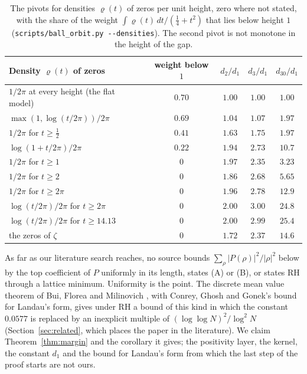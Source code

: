 \documentclass[11pt]{article}
\theoremstyle{definition}
\begin{document}
\begin{table}[ht]
\centering
\small
\begin{tabular}{@{}lcccc@{}}
\toprule
Density $\varrho(t)$ of zeros & weight below $1$ & $d_2/d_1$ & $d_3/d_1$ & $d_{30}/d_1$ \\
\midrule
$1/2\pi$ at every height (the flat model) & $0.70$ & $1.00$ & $1.00$ & $1.00$ \\
$\max(1, \log(t/2\pi))/2\pi$ & $0.69$ & $1.04$ & $1.07$ & $1.97$ \\
$1/2\pi$ for $t \ge \frac12$ & $0.41$ & $1.63$ & $1.75$ & $1.97$ \\
$\log(1 + t/2\pi)/2\pi$ & $0.22$ & $1.94$ & $2.73$ & $10.7$ \\
$1/2\pi$ for $t \ge 1$ & $0$ & $1.97$ & $2.35$ & $3.23$ \\
$1/2\pi$ for $t \ge 2$ & $0$ & $1.86$ & $2.68$ & $5.65$ \\
$1/2\pi$ for $t \ge 2\pi$ & $0$ & $1.96$ & $2.78$ & $12.9$ \\
$\log(t/2\pi)/2\pi$ for $t \ge 2\pi$ & $0$ & $2.00$ & $3.00$ & $24.8$ \\
$\log(t/2\pi)/2\pi$ for $t \ge 14.13$ & $0$ & $2.00$ & $2.99$ & $25.4$ \\
the zeros of $\zeta$ & $0$ & $1.72$ & $2.37$ & $14.6$ \\
\bottomrule
\end{tabular}
\caption{The pivots for densities $\varrho(t)$ of zeros per unit height, zero where not stated, with the share of the
weight $\int \varrho(t)\,dt/(\frac14 + t^2)$ that lies below height $1$ (\texttt{scripts/ball\_orbit.py
-{}-densities}). The second pivot is not monotone in the height of the gap.}
\label{tab:densities}
\end{table}

As far as our literature search reaches, no source bounds $\sum_\rho |P(\rho)|^2/|\rho|^2$ below by the top
coefficient of $P$ uniformly in its length, states (A) or (B), or states RH through a lattice minimum. Uniformity is
the point. The discrete mean value theorem of Bui, Florea and Milinovich \cite[Theorem~3.1]{bfm24}, with Conrey,
Ghosh and Gonek's bound for Landau's form, gives under RH a bound of this kind in which the constant $0.0577$ is
replaced by an inexplicit multiple of $(\log\log N)^2/\log^2 N$ (Section~\ref{sec:related}, which places the paper
in the literature). We claim Theorem~\ref{thm:margin} and the corollary it gives; the positivity layer, the kernel, the
constant $d_1$ and the bound for Landau's form from which the last step of the proof starts are not ours.
\end{document}

